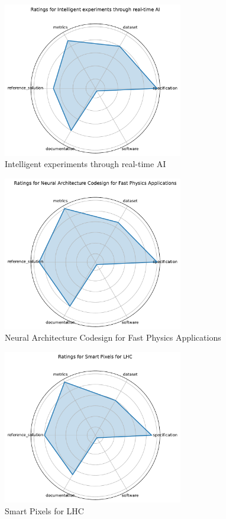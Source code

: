\documentclass{article}
\begin{document}
\begin{figure}[h!]
  \centering
  \includegraphics[width=0.7\textwidth]{Intelligent experiments through real-time AI_radar.pdf}
  \caption{Intelligent experiments through real-time AI}
\end{figure}

\begin{figure}[h!]
  \centering
  \includegraphics[width=0.7\textwidth]{Neural Architecture Codesign for Fast Physics Applications_radar.pdf}
  \caption{Neural Architecture Codesign for Fast Physics Applications}
\end{figure}

\begin{figure}[h!]
  \centering
  \includegraphics[width=0.7\textwidth]{Smart Pixels for LHC_radar.pdf}
  \caption{Smart Pixels for LHC}
\end{figure}
\end{document}
